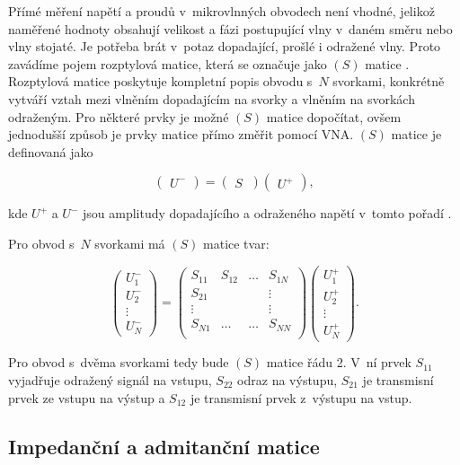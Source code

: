 \documentclass{protokol}
\begin{document}
Přímé měření napětí a proudů v~mikrovlnných obvodech není vhodné, jelikož naměřené hodnoty obsahují velikost a fázi postupující vlny v~daném směru nebo vlny stojaté. Je potřeba brát v~potaz dopadající, prošlé i odražené vlny. Proto zavádíme pojem rozptylová matice, která se označuje jako $(S)$ matice \cite{Pozar}. Rozptylová matice poskytuje kompletní popis obvodu s~$N$ svorkami, konkrétně vytváří vztah mezi vlněním dopadajícím na svorky a vlněním na svorkách odraženým. Pro některé prvky je možné $(S)$ matice dopočítat, ovšem jednodušší způsob je prvky matice přímo změřit pomocí VNA. $(S)$ matice je definovaná jako

\[
\begin{pmatrix}
	U^-
\end{pmatrix}
=
\begin{pmatrix}
	S~\end{pmatrix}
%
\begin{pmatrix}
	U^+
\end{pmatrix}
,\]

kde $U^+$ a $U^-$ jsou amplitudy dopadajícího a odraženého napětí v~tomto pořadí \cite{Pozar}.

Pro obvod s~$N$ svorkami má $(S)$ matice tvar:

\[
\begin{pmatrix}
	U_1^-     \\
	U_2^-		\\
	\vdots	\\
	U_N^-
\end{pmatrix}
=
\begin{pmatrix}
	S_{11} & S_{12} & \dots & S_{1N}   \\
	S_{21} &		& 		& \vdots	\\
	\vdots &		& 		& \vdots	\\
	S_{N1} & \dots	& \dots & S_{NN} 	\\    
\end{pmatrix} 
%
\begin{pmatrix}
	U_1^+     \\
	U_2^+		\\
	\vdots	\\
	U_N^+      
\end{pmatrix}
.\]

Pro obvod s~dvěma svorkami tedy bude $(S)$ matice řádu 2. V~ní prvek $S_{11}$ vyjadřuje odražený signál na vstupu, $S_{22}$ odraz na výstupu, $S_{21}$ je transmisní prvek ze vstupu na výstup a $S_{12}$ je transmisní prvek z~výstupu na vstup. 

\subsection{Impedanční a admitanční matice}
\end{document}
